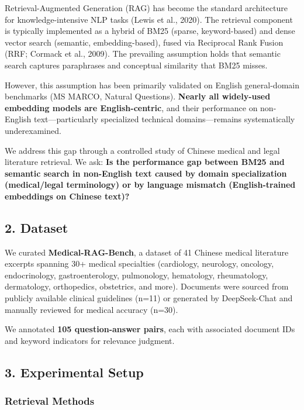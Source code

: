\documentclass[
]{article}
\begin{document}
Retrieval-Augmented Generation (RAG) has become the standard
architecture for knowledge-intensive NLP tasks (Lewis et al., 2020). The
retrieval component is typically implemented as a hybrid of BM25
(sparse, keyword-based) and dense vector search (semantic,
embedding-based), fused via Reciprocal Rank Fusion (RRF; Cormack et al.,
2009). The prevailing assumption holds that semantic search captures
paraphrases and conceptual similarity that BM25 misses.

However, this assumption has been primarily validated on English
general-domain benchmarks (MS MARCO, Natural Questions). \textbf{Nearly
all widely-used embedding models are English-centric}, and their
performance on non-English text---particularly specialized technical
domains---remains systematically underexamined.

We address this gap through a controlled study of Chinese medical and
legal literature retrieval. We ask: \textbf{Is the performance gap
between BM25 and semantic search in non-English text caused by domain
specialization (medical/legal terminology) or by language mismatch
(English-trained embeddings on Chinese text)?}

\subsection{2. Dataset}\label{dataset}

We curated \textbf{Medical-RAG-Bench}, a dataset of 41 Chinese medical
literature excerpts spanning 30+ medical specialties (cardiology,
neurology, oncology, endocrinology, gastroenterology, pulmonology,
hematology, rheumatology, dermatology, orthopedics, obstetrics, and
more). Documents were sourced from publicly available clinical
guidelines (n=11) or generated by DeepSeek-Chat and manually reviewed
for medical accuracy (n=30).

We annotated \textbf{105 question-answer pairs}, each with associated
document IDs and keyword indicators for relevance judgment.

\subsection{3. Experimental Setup}\label{experimental-setup}

\subsubsection{Retrieval Methods}\label{retrieval-methods}
\end{document}
